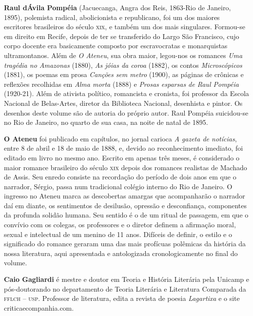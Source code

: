 \textbf{Raul dÁvila Pompéia} (Jacuecanga, Angra dos Reis, 1863{}-Rio de Janeiro, 1895), 
polemista radical, abolicionista e republicano, foi um dos maiores escritores
brasileiros do século \textsc{xix}, e também um dos mais singulares. Formou{}-se
em direito em Recife, depois de ter se transferido do Largo São
Francisco, cujo corpo docente era basicamente composto por
escravocratas e monarquistas ultramontanos. Além de \textit{O
Ateneu}, sua obra maior, legou{}-nos os romances
\textit{Uma tragédia no Amazonas} (1880),
\textit{As jóias da coroa} (1882), os contos
\textit{Microscópicos} (1881), os poemas em
prosa \textit{Canções sem metro} (1900), as páginas de crônicas 
e reflexões recolhidas em \textit{Alma
morta} (1888) e \textit{Prosas esparsas de
Raul Pompéia} (1920{}-21). Além de ativista político,
romancista e cronista, foi professor da Escola
Nacional de Belas{}-Artes, diretor da Biblioteca Nacional, desenhista e
pintor. Os desenhos deste volume são de autoria do próprio autor. Raul
Pompéia suicidou{}-se no Rio de Janeiro, no quarto de sua casa, na
noite de natal de 1895.


\textbf{O Ateneu} foi publicado em capítulos,
no jornal carioca \textit{A gazeta de
notícias}, entre 8 de abril e 18 de maio de 1888, e,
devido ao reconhecimento imediato, foi editado em livro no mesmo ano.
Escrito em apenas três meses, é considerado o maior romance brasileiro do
século \textsc{xix} depois dos romances realistas de Machado de Assis. Seu
enredo consiste na recordação do período de dois anos em que o narrador,
Sérgio, passa num tradicional colégio interno do Rio de Janeiro. O
ingresso no Ateneu marca as descobertas amargas que acompanharão o
narrador daí em diante, os sentimentos de desilusão, opressão e
desconfiança, componentes da profunda solidão humana. Seu sentido é o
de um ritual de passagem, em que o convívio com os colegas, os
professores e o diretor definem a afirmação moral, sexual e intelectual
de um menino de 11 anos. Difíceis de definir, o estilo e o
significado do romance geraram uma das mais profícuas polêmicas da
história da nossa literatura, aqui apresentada e antologizada
cronologicamente no final do volume.


\textbf{Caio Gagliardi} é mestre e doutor em Teoria e
História Literária pela Unicamp e pós{}-doutorando no departamento de
Teoria Literária e Literatura Comparada da \textsc{fflch -- usp}. Professor de
literatura, edita a revista de poesia \textit{Lagartixa}
e o site criticaecompanhia.com.


